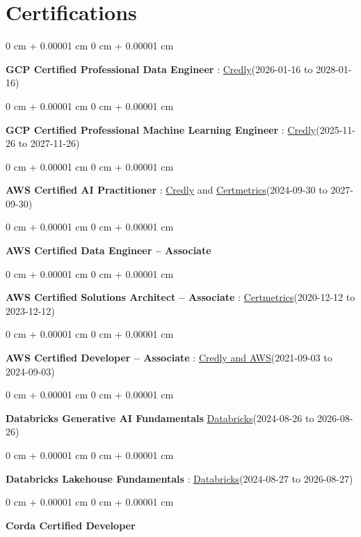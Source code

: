 \documentclass[10pt, letterpaper]{article}
\newenvironment{onecolentry}{
    \begin{adjustwidth}{
        0 cm + 0.00001 cm
    }{
        0 cm + 0.00001 cm
    }
}{
    \end{adjustwidth}
} %
\begin{document}
    \vspace{2 pt }
    \section{Certifications}
        \vspace{2 pt }
        \begin{samepage}
            \begin{onecolentry}
                \textbf{GCP Certified Professional Data Engineer} : \href{https://www.credly.com/badges/977e96d9-12e7-4f6c-b8a7-df71fb7153b8/public_url}{Credly}(2026-01-16 to 2028-01-16)
            \end{onecolentry}
            \begin{onecolentry}
                \textbf{GCP Certified Professional Machine Learning Engineer} : \href{https://www.credly.com/badges/a6965347-09ea-4d8f-b398-0e151407160d/public_url}{Credly}(2025-11-26 to 2027-11-26)
            \end{onecolentry}
            \begin{onecolentry}
                \textbf{AWS Certified AI Practitioner} : \href{https://www.credly.com/badges/451b7ba5-8be1-4a8e-bbec-ade26627a6b6/public_url}{Credly} and \href{https://cp.certmetrics.com/amazon/en/public/verify/credential/495f0d9853874bf9a33c17f8e89ce131}{Certmetrics}(2024-09-30 to 2027-09-30)
            \end{onecolentry}
            \begin{onecolentry}
                \textbf{AWS Certified Data Engineer – Associate}
            \end{onecolentry}
            \begin{onecolentry}
                \textbf{AWS Certified Solutions Architect – Associate} : \href{https://cp.certmetrics.com/amazon/en/public/verify/credential/SNBY48EBJJVE1SWX}{Certmetrics}(2020-12-12 to 2023-12-12)
            \end{onecolentry}
            \begin{onecolentry}
                \textbf{AWS Certified Developer – Associate} : \href{https://www.credly.com/badges/b8106fbd-d3d1-4204-8cdf-e708798fd582/public_url}{Credly and AWS}(2021-09-03  to 2024-09-03)
            \end{onecolentry}
            \begin{onecolentry}
                \textbf{Databricks Generative AI Fundamentals} \href{https://sgq.io/3uIFGNi}{Databricks}(2024-08-26 to 2026-08-26)
            \end{onecolentry}
                \begin{onecolentry}
                \textbf{Databricks Lakehouse Fundamentals} : \href{https://scl.io/FXGKS0u}{Databricks}(2024-08-27 to 2026-08-27)
            \end{onecolentry}
            \begin{onecolentry}
                \textbf{Corda Certified Developer}
            \end{onecolentry}
        \end{samepage}
\end{document}
